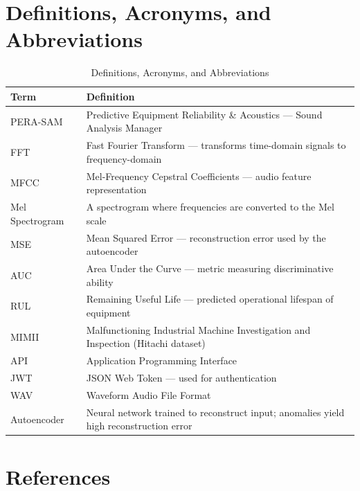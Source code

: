 \documentclass[10pt, a4paper, oneside]{report}
\begin{document}
\section{Definitions, Acronyms, and Abbreviations}
\label{sec:definitions}

\begin{table}[H]
\centering
\caption{Definitions, Acronyms, and Abbreviations}
\label{tab:definitions}
\begin{tabularx}{\textwidth}{l X}
  \toprule
  \textbf{Term} & \textbf{Definition} \\
  \midrule
  PERA-SAM       & Predictive Equipment Reliability \& Acoustics --- Sound Analysis Manager \\
  FFT            & Fast Fourier Transform --- transforms time-domain signals to frequency-domain \\
  MFCC           & Mel-Frequency Cepstral Coefficients --- audio feature representation \\
  Mel Spectrogram & A spectrogram where frequencies are converted to the Mel scale \\
  MSE            & Mean Squared Error --- reconstruction error used by the autoencoder \\
  AUC            & Area Under the Curve --- metric measuring discriminative ability \\
  RUL            & Remaining Useful Life --- predicted operational lifespan of equipment \\
  MIMII          & Malfunctioning Industrial Machine Investigation and Inspection (Hitachi dataset) \\
  API            & Application Programming Interface \\
  JWT            & JSON Web Token --- used for authentication \\
  WAV            & Waveform Audio File Format \\
  Autoencoder    & Neural network trained to reconstruct input; anomalies yield high reconstruction error \\
  \bottomrule
\end{tabularx}
\end{table}

\section{References}
\label{sec:references}
\end{document}
